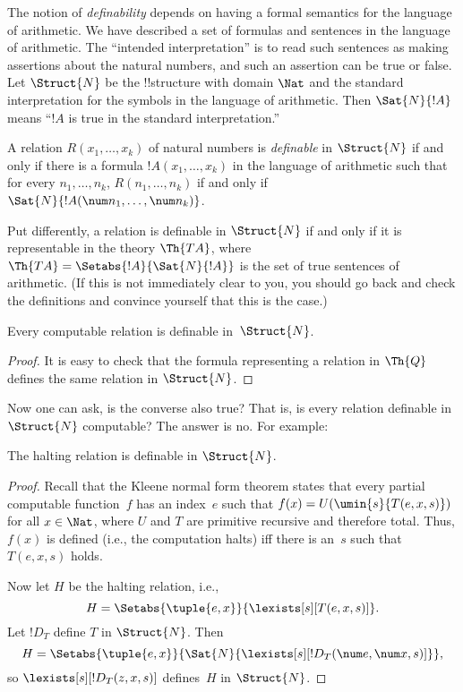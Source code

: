 \documentclass[../../../include/open-logic-section]{subfiles}
\begin{document}


The notion of \emph{definability} depends on having a formal semantics
for the language of arithmetic.  We have described a set of formulas
and sentences in the language of arithmetic. The ``intended
interpretation'' is to read such sentences as making assertions about
the natural numbers, and such an assertion can be true or false. Let
$\Struct{N}$ be the !!{structure} with domain $\Nat$ and the standard
interpretation for the symbols in the language of arithmetic.  Then
$\Sat{N}{!A}$ means ``$!A$ is true in the standard interpretation.''

\begin{defn}
A relation $R(x_1,\dots,x_k)$ of natural numbers is \emph{definable}
in $\Struct{N}$ if and only if there is a formula $!A(x_1,\dots,x_k)$
in the language of arithmetic such that for every $n_1,\dots,n_k$,
$R(n_1,\dots,n_k)$ if and only if $\Sat{N}{!A(\num n_1,\dots,\num
  n_k)}$.
\end{defn}

Put differently, a relation is definable in $\Struct{N}$ if and
only if it is representable in the theory $\Th{TA}$, where $\Th{TA} =
\Setabs{!A}{\Sat{N}{!A}}$ is the set of true sentences of
arithmetic. (If this is not immediately clear to you, you should go
back and check the definitions and convince yourself that this is the
case.)

\begin{lem}
Every computable relation is definable in~$\Struct{N}$.
\end{lem}

\begin{proof}
It is easy to check that the formula representing a relation in
$\Th{Q}$ defines the same relation in $\Struct{N}$. 
\end{proof}

Now one can ask, is the converse also true?  That is, is every
relation definable in~$\Struct{N}$ computable? The answer is no. For
example:

\begin{lem}
The halting relation is definable in $\Struct{N}$.
\end{lem}

\begin{proof}
Recall that the Kleene normal form theorem states that every partial
computable function~$f$ has an index~$e$ such that $f(x) =
U(\umin{s}{T(e,x,s)})$ for all $x \in \Nat$, where $U$ and $T$ are
primitive recursive and therefore total. Thus, $f(x)$ is defined
(i.e., the computation halts) iff there is an~$s$ such that $T(e,x,s)$
holds.

Now let $H$ be the halting relation, i.e.,
\[
H = \Setabs{\tuple{e,x}}{\lexists[s][T(e, x, s)]}.
\]
Let $!D_T$ define $T$ in $\Struct{N}$. Then
\[
H = \Setabs{\tuple{e,x}}{\Sat{N}{\lexists[s][!D_T(\num e, \num x, s)]}},
\]
so $\lexists[s][!D_T(z, x, s)]$ defines~$H$ in $\Struct{N}$. 
\end{proof}
\end{document}
